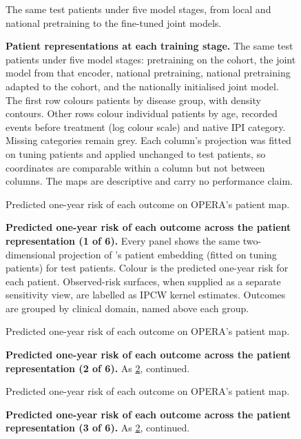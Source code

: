 \begin{figure}[p]
    {The same test patients under five model stages, from local and national
    pretraining to the fine-tuned joint models.}
  \caption{\textbf{Patient representations at each training stage.}
  The same test patients under five model stages: pretraining on the cohort,
  the joint model from that encoder, national pretraining, national pretraining
  adapted to the cohort, and the nationally initialised joint model. The first
  row colours patients by disease group, with density contours. Other rows
  colour individual patients by age, recorded events before treatment
  (log colour scale) and native IPI category. Missing categories remain grey.
  Each column's projection
  was fitted on tuning patients and applied unchanged to test patients, so
  coordinates are comparable within a column but not between columns. The maps
  are descriptive and carry no performance claim.}
  \label{fig:supp-embedding-comparison}
\end{figure}

\begin{figure}[p]
    {Predicted one-year risk of each outcome on OPERA's patient map.}
  \caption{\textbf{Predicted one-year risk of each outcome across the patient representation (1 of 6).}
  Every panel shows the same two-dimensional projection of \opera{}'s
  patient embedding (fitted on tuning patients) for test patients. Colour is
  the predicted one-year risk for each patient. Observed-risk surfaces, when
  supplied as a separate sensitivity view, are labelled as IPCW kernel estimates. Outcomes are grouped by
  clinical domain, named above each group.}
  \label{fig:supp-embedding-gallery-1}
\end{figure}

\begin{figure}[p]
    {Predicted one-year risk of each outcome on OPERA's patient map.}
  \caption{\textbf{Predicted one-year risk of each outcome across the patient representation (2 of 6).}
  As \cref{fig:supp-embedding-gallery-1}, continued.}
  \label{fig:supp-embedding-gallery-2}
\end{figure}

\begin{figure}[p]
    {Predicted one-year risk of each outcome on OPERA's patient map.}
  \caption{\textbf{Predicted one-year risk of each outcome across the patient representation (3 of 6).}
  As \cref{fig:supp-embedding-gallery-1}, continued.}
  \label{fig:supp-embedding-gallery-3}
\end{figure}

